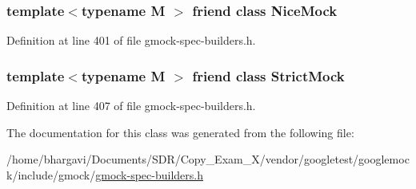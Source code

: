 \subsubsection[{\texorpdfstring{Nice\+Mock}{NiceMock}}]{\setlength{\rightskip}{0pt plus 5cm}template$<$typename M $>$ friend class {\bf Nice\+Mock}\hspace{0.3cm}{\ttfamily [friend]}}\hypertarget{classtesting_1_1_mock_a9e796f79d4c876398f83aa7678dddc46}{}\label{classtesting_1_1_mock_a9e796f79d4c876398f83aa7678dddc46}


Definition at line 401 of file gmock-\/spec-\/builders.\+h.

\subsubsection[{\texorpdfstring{Strict\+Mock}{StrictMock}}]{\setlength{\rightskip}{0pt plus 5cm}template$<$typename M $>$ friend class {\bf Strict\+Mock}\hspace{0.3cm}{\ttfamily [friend]}}\hypertarget{classtesting_1_1_mock_a88b3d71476c27b82c88bd49e8297e20e}{}\label{classtesting_1_1_mock_a88b3d71476c27b82c88bd49e8297e20e}


Definition at line 407 of file gmock-\/spec-\/builders.\+h.



The documentation for this class was generated from the following file\+:\begin{DoxyCompactItemize}
\item 
/home/bhargavi/\+Documents/\+S\+D\+R/\+Copy\+\_\+\+Exam\+\_\+X/vendor/googletest/googlemock/include/gmock/\hyperlink{gmock-spec-builders_8h}{gmock-\/spec-\/builders.\+h}\end{DoxyCompactItemize}
